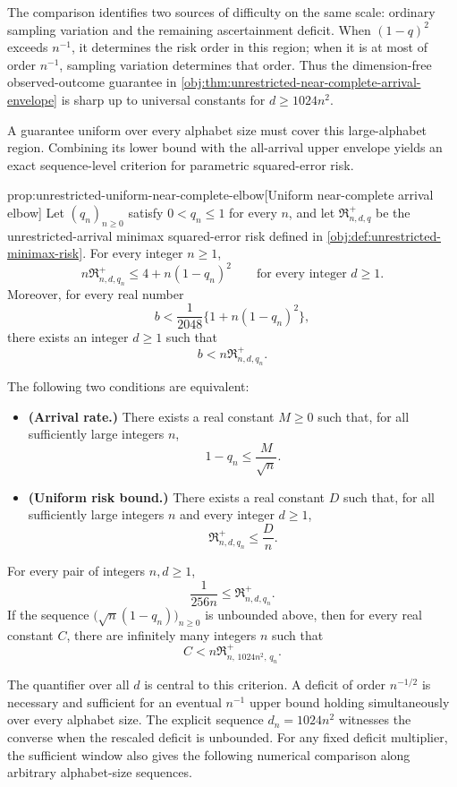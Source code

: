 \documentclass[11pt]{article}
\begin{document}
The comparison identifies two sources of difficulty on the same scale: ordinary sampling variation and the remaining ascertainment deficit. When \((1-q)^2\) exceeds \(n^{-1}\), it determines the risk order in this region; when it is at most of order \(n^{-1}\), sampling variation determines that order. Thus the dimension-free observed-outcome guarantee in \cref{obj:thm:unrestricted-near-complete-arrival-envelope} is sharp up to universal constants for \(d\ge1024n^2\).

A guarantee uniform over every alphabet size must cover this large-alphabet region. Combining its lower bound with the all-arrival upper envelope yields an exact sequence-level criterion for parametric squared-error risk.

\begin{propositionv}{prop:unrestricted-uniform-near-complete-elbow}[Uniform near-complete arrival elbow]
Let \((q_n)_{n\ge0}\) satisfy \(0<q_n\le1\) for every \(n\), and let \(\mathfrak R^{+}_{n,d,q}\) be the unrestricted-arrival minimax squared-error risk defined in \cref{obj:def:unrestricted-minimax-risk}. For every integer \(n\ge1\),
\[
n\mathfrak R^{+}_{n,d,q_n}\le 4+n(1-q_n)^2
\qquad\text{for every integer }d\ge1.
\]
Moreover, for every real number
\[
b<\frac{1}{2048}\bigl\{1+n(1-q_n)^2\bigr\},
\]
there exists an integer \(d\ge1\) such that
\[
b<n\mathfrak R^{+}_{n,d,q_n}.
\]

The following two conditions are equivalent:
\begin{itemize}
\item \textbf{(Arrival rate.)} There exists a real constant \(M\ge0\) such that, for all sufficiently large integers \(n\),
\[
1-q_n\le \frac{M}{\sqrt n}.
\]
\item \textbf{(Uniform risk bound.)} There exists a real constant \(D\) such that, for all sufficiently large integers \(n\) and every integer \(d\ge1\),
\[
\mathfrak R^{+}_{n,d,q_n}\le \frac{D}{n}.
\]
\end{itemize}

For every pair of integers \(n,d\ge1\),
\[
\frac{1}{256n}\le \mathfrak R^{+}_{n,d,q_n}.
\]
If the sequence \(\bigl(\sqrt n(1-q_n)\bigr)_{n\ge0}\) is unbounded above, then for every real constant \(C\), there are infinitely many integers \(n\) such that
\[
C<n\mathfrak R^{+}_{n,\,1024n^2,\,q_n}.
\]
\end{propositionv}

The quantifier over all \(d\) is central to this criterion. A deficit of order \(n^{-1/2}\) is necessary and sufficient for an eventual \(n^{-1}\) upper bound holding simultaneously over every alphabet size. The explicit sequence \(d_n=1024n^2\) witnesses the converse when the rescaled deficit is unbounded. For any fixed deficit multiplier, the sufficient window also gives the following numerical comparison along arbitrary alphabet-size sequences.
\end{document}
